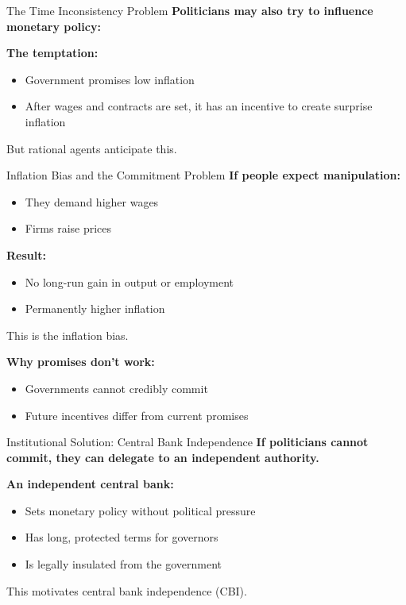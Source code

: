 \documentclass[10pt]{beamer}
\begin{document}
\begin{frame}{The Time Inconsistency Problem}
\textbf{Politicians may also try to influence monetary policy:}

\vspace{0.3cm}
\textbf{The temptation:}
\begin{itemize}
\item Government promises low inflation
\item After wages and contracts are set, it has an incentive to create surprise inflation
\end{itemize}

\vspace{0.4cm}
\alert{But rational agents anticipate this.}
\end{frame}


\begin{frame}{Inflation Bias and the Commitment Problem}
\textbf{If people expect manipulation:}
\begin{itemize}
\item They demand higher wages
\item Firms raise prices
\end{itemize}

\vspace{0.3cm}
\textbf{Result:}
\begin{itemize}
\item No long-run gain in output or employment
\item Permanently higher inflation
\end{itemize}

\vspace{0.3cm}
\alert{This is the inflation bias.}

\vspace{0.3cm}
\textbf{Why promises don't work:}
\begin{itemize}
\item Governments cannot credibly commit
\item Future incentives differ from current promises
\end{itemize}
\end{frame}

\begin{frame}{Institutional Solution: Central Bank Independence}
\textbf{If politicians cannot commit, they can delegate to an independent authority.}

\vspace{0.3cm}
\textbf{An independent central bank:}
\begin{itemize}
\item Sets monetary policy without political pressure
\item Has long, protected terms for governors
\item Is legally insulated from the government
\end{itemize}

\vspace{0.3cm}
\alert{This motivates central bank independence (CBI).}
\end{frame}
\end{document}

